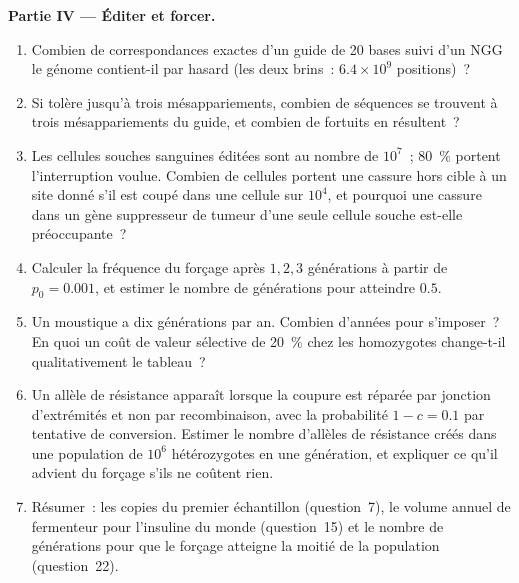 \begin{problem}
\medskip
\noindent\textbf{Partie IV --- Éditer et forcer.}
\begin{enumerate}[resume]
  \item Combien de correspondances exactes d'un guide de 20 bases suivi
        d'un NGG le génome contient-il par hasard (les deux brins~:
        $6.4\times 10^{9}$ positions)~?
  \item Si  tolère jusqu'à trois mésappariements, combien de
        séquences se trouvent à trois mésappariements du guide, et
        combien de  fortuits en résultent~?
  \item Les cellules souches sanguines éditées sont au nombre de
        $10^{7}$~; \qty{80}{\%} portent l'interruption voulue. Combien
        de cellules portent une cassure hors cible à un site donné s'il
        est coupé dans une cellule sur $10^{4}$, et pourquoi une
        cassure dans un gène suppresseur de tumeur d'une seule cellule
        souche est-elle préoccupante~?
  \item Calculer la fréquence du forçage après $1, 2, 3$ générations à
        partir de $p_{0} = 0.001$, et estimer le nombre de générations
        pour atteindre $0.5$.
  \item Un moustique a dix générations par an. Combien d'années pour
        s'imposer~? En quoi un coût de valeur sélective de
        \qty{20}{\%} chez les homozygotes change-t-il qualitativement
        le tableau~?
  \item Un allèle de résistance apparaît lorsque la coupure est réparée
        par jonction d'extrémités et non par recombinaison, avec la
        probabilité $1 - c = 0.1$ par tentative de conversion. Estimer
        le nombre d'allèles de résistance créés dans une population de
        $10^{6}$ hétérozygotes en une génération, et expliquer ce qu'il
        advient du forçage s'ils ne coûtent rien.
  \item Résumer~: les copies du premier échantillon (question~7), le
        volume annuel de fermenteur pour l'insuline du monde
        (question~15) et le nombre de générations pour que le forçage
        atteigne la moitié de la population (question~22).
\end{enumerate}
\end{problem}

